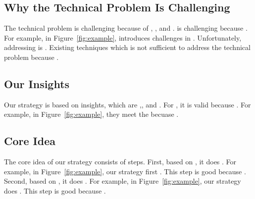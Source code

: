 \subsection{Why the Technical Problem Is Challenging}
The technical problem \blank{} is challenging because of , , and .   is challenging because \blank{}. For example, in Figure~\ref{fig:example},  introduces challenges in . Unfortunately, addressing  is . Existing techniques which is not sufficient to address the technical problem because \blank{}.   

\subsection{Our Insights}
Our strategy is based on \blank{} insights, which are \blank{},\blank{}, and \blank{}.  For , it is valid because \blank{}. For example, in Figure~\ref{fig:example},  they meet the  becuase \blank{}.  

\subsection{Core Idea}
The core idea of our strategy consists of \blank{} steps.  First, based on , it does \blank{}. For example, in Figure~\ref{fig:example}, our strategy first . This step is good because \blank{}. Second, based on , it does \blank{}. For example, in Figure~\ref{fig:example}, our strategy does \blank{}. This step is good because \blank{}.

